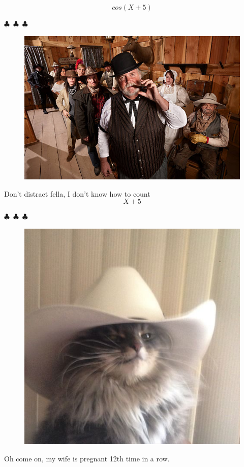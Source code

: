 \documentclass{article}
\begin{document}
\begin{equation}
{cos({{X}+{5}})}
\end{equation}
\begin{center} $\clubsuit$~$\clubsuit$~$\clubsuit$ \end{center}\begin{figure}[H] \includegraphics[scale=1.4]{funny_pics/funny_bartender.jpg} \end{figure} Don't distract fella, I don't know how to count
\begin{equation}
{{X}+{5}}
\end{equation}
\begin{center} $\clubsuit$~$\clubsuit$~$\clubsuit$ \end{center}\begin{figure}[H] \includegraphics[scale=0.3]{funny_pics/cowboy_cat.jpg} \end{figure}Oh come on, my wife is pregnant 12th time in a row.
\end{document}
